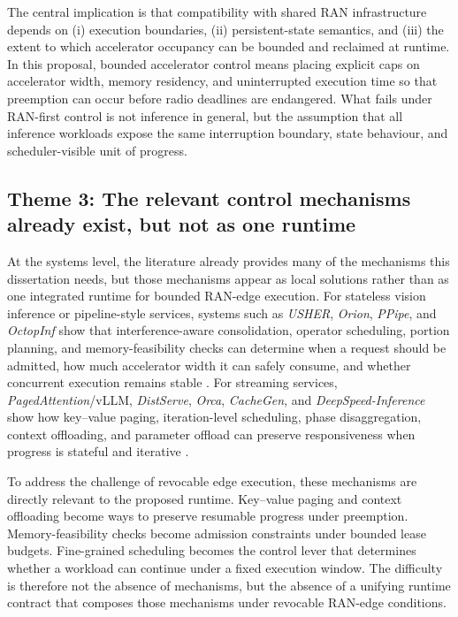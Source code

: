 \documentclass[a4paper,11pt]{article}
\begin{document}
The central implication is that compatibility with shared RAN infrastructure depends on (i) execution boundaries, (ii) persistent-state semantics, and (iii) the extent to which accelerator occupancy can be bounded and reclaimed at runtime. In this proposal, bounded accelerator control means placing explicit caps on accelerator width, memory residency, and uninterrupted execution time so that preemption can occur before radio deadlines are endangered. What fails under RAN-first control is not inference in general, but the assumption that all inference workloads expose the same interruption boundary, state behaviour, and scheduler-visible unit of progress.

\subsection{Theme 3: The relevant control mechanisms already exist, but not as one runtime}

At the systems level, the literature already provides many of the mechanisms this dissertation needs, but those mechanisms appear as local solutions rather than as one integrated runtime for bounded RAN-edge execution. For stateless vision inference or pipeline-style services, systems such as \textit{USHER}, \textit{Orion}, \textit{PPipe}, and \textit{OctopInf} show that interference-aware consolidation, operator scheduling, portion planning, and memory-feasibility checks can determine when a request should be admitted, how much accelerator width it can safely consume, and whether concurrent execution remains stable \cite{usher,orion,ppipe,octopinf}. For streaming services, \textit{PagedAttention}/vLLM, \textit{DistServe}, \textit{Orca}, \textit{CacheGen}, and \textit{DeepSpeed-Inference} show how key--value paging, iteration-level scheduling, phase disaggregation, context offloading, and parameter offload can preserve responsiveness when progress is stateful and iterative \cite{pagedattention,distserve,orca,cachegen,deepspeedinfer}.

To address the challenge of revocable edge execution, these mechanisms are directly relevant to the proposed runtime. Key--value paging and context offloading become ways to preserve resumable progress under preemption. Memory-feasibility checks become admission constraints under bounded lease budgets. Fine-grained scheduling becomes the control lever that determines whether a workload can continue under a fixed execution window. The difficulty is therefore not the absence of mechanisms, but the absence of a unifying runtime contract that composes those mechanisms under revocable RAN-edge conditions.
\end{document}
